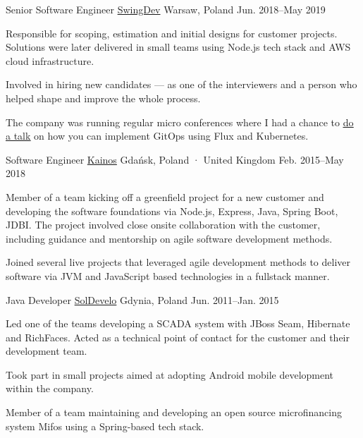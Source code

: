 \begin{cventries}
  \cventry
    {Senior Software Engineer} %
    {\href{https://www.swing.dev}{SwingDev}} %
    {Warsaw, Poland} %
    {Jun. 2018–May 2019} %
    {
      \begin {cvitems} %
        \item {Responsible for scoping, estimation and initial designs for customer projects. Solutions were later delivered in small teams using Node.js tech stack and AWS cloud infrastructure.}
        \item {Involved in hiring new candidates — as one of the interviewers and a person who helped shape and improve the whole process.}
        \item {The company was running regular micro conferences where I had a chance to \href{https://www.youtube.com/watch?v=5zt-jzKHwX8}{\underline{do a talk}} on how you can implement GitOps using Flux and Kubernetes.}
      \end {cvitems}
    }

  \cventry
    {Software Engineer} %
    {\href{https://www.kainos.com}{Kainos}} %
    {Gdańsk, Poland · United Kingdom} %
    {Feb. 2015–May 2018} %
    {
      \begin{cvitems} %
        \item {Member of a team kicking off a greenfield project for a new customer and developing the software foundations via Node.js, Express, Java, Spring Boot, JDBI. The project involved close onsite collaboration with the customer, including guidance and mentorship on agile software development methods.}
        \item {Joined several live projects that leveraged agile development methods to deliver software via JVM and JavaScript based technologies in a fullstack manner.}
      \end{cvitems}
    }

  \cventry
    {Java Developer} %
    {\href{https://www.soldevelo.com}{SolDevelo}} %
    {Gdynia, Poland} %
    {Jun. 2011–Jan. 2015} %
    {
      \begin{cvitems} %
        \item {Led one of the teams developing a SCADA system with JBoss Seam, Hibernate and RichFaces. Acted as a technical point of contact for the customer and their development team.}
        \item {Took part in small projects aimed at adopting Android mobile development within the company.}
        \item {Member of a team maintaining and developing an open source microfinancing system Mifos using a Spring-based tech stack.}
      \end{cvitems}
    }

\end{cventries}
